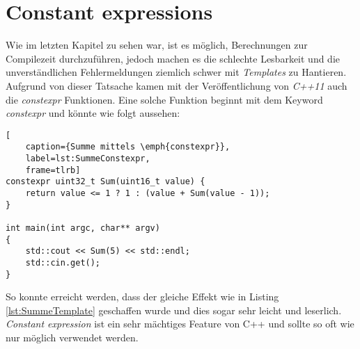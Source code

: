 \section{Constant expressions}\label{sec:constexpr}
Wie im letzten Kapitel \emph{} zu sehen war, ist es möglich, Berechnungen
zur Compilezeit durchzuführen, jedoch machen es die schlechte Lesbarkeit und die unverständlichen
Fehlermeldungen ziemlich schwer mit \emph{Templates} zu Hantieren. Aufgrund von dieser Tatsache
kamen mit der Veröffentlichung von \emph{C++11} auch die \emph{constexpr} Funktionen. Eine solche
Funktion beginnt mit dem Keyword \emph{constexpr} und könnte wie folgt aussehen:

\begin{lstlisting}[
    caption={Summe mittels \emph{constexpr}},
    label=lst:SummeConstexpr,
    frame=tlrb]
constexpr uint32_t Sum(uint16_t value) {
	return value <= 1 ? 1 : (value + Sum(value - 1));
}

int main(int argc, char** argv)
{
	std::cout << Sum(5) << std::endl;
	std::cin.get();
}
\end{lstlisting}

So konnte erreicht werden, dass der gleiche Effekt wie in Listing \ref{lst:SummeTemplate} 
geschaffen wurde und dies sogar sehr leicht und leserlich. \emph{Constant expression} ist ein sehr
mächtiges Feature von C++ und sollte so oft wie nur möglich verwendet werden.